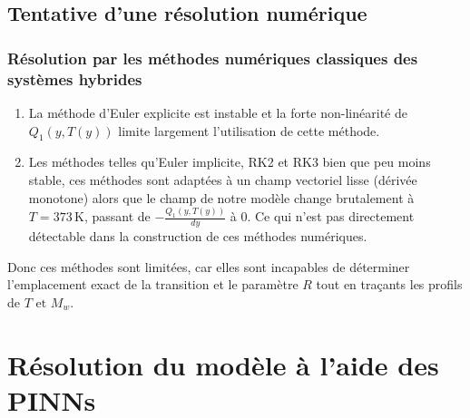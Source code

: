 \documentclass[12pt, oneside]{report} %
\theoremstyle{definition}
\theoremstyle{remark}
\begin{document}
\subsection{Tentative d'une résolution numérique}
\subsubsection*{Résolution par les méthodes numériques classiques des systèmes hybrides}

\begin{enumerate}
	\item La méthode d'Euler explicite est instable et la forte non-linéarité de $Q_1(y, T(y))$ limite largement l'utilisation de cette méthode. 
	\item Les méthodes telles qu'Euler implicite, RK2 et RK3 bien que peu moins stable, ces méthodes sont adaptées à un champ vectoriel lisse (dérivée monotone) alors que le champ de notre modèle change brutalement à $T= 373\,\mathrm{K}$, passant de $-\frac{Q_1(y, T(y))}{dy}$ à $0$. Ce qui n'est pas directement détectable dans la construction de ces méthodes numériques.
	\end{enumerate} 
	Donc ces méthodes sont limitées, car elles sont incapables de déterminer l'emplacement exact de la transition et le paramètre $R$ tout en traçants les profils de $T \text{ et }M_w$.
%	

		\section{Résolution du modèle à l'aide des PINNs}
		\label{chp:RN}
			
\end{document}
